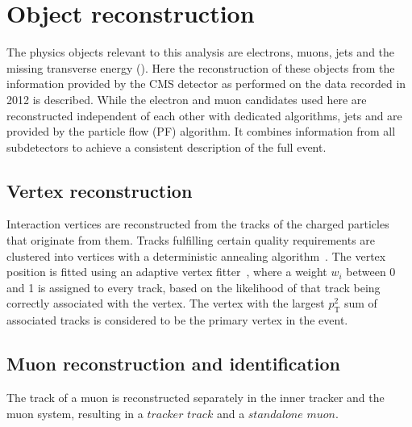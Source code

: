 \section{Object reconstruction}
The physics objects relevant to this analysis are electrons, muons, jets and the missing transverse energy (\MET). Here the reconstruction of these objects from the information provided by the CMS detector as performed on the data recorded in 2012 is described. While the electron and muon candidates used here are reconstructed independent of each other with dedicated algorithms, jets and \MET are provided by the particle flow (PF) algorithm. It combines information from all subdetectors to achieve a consistent description of the full event. 

\subsection{Vertex reconstruction}
Interaction vertices are reconstructed from the tracks of the charged particles that originate from them.
Tracks fulfilling certain quality requirements are clustered into vertices with a deterministic annealing algorithm~\cite{DertermisiticAnnealing,Chatrchyan:2014fea}. The vertex position is fitted using an adaptive vertex fitter~\cite{Fruehwirth:1027031}, where a weight $w_i$ between 0 and 1 is assigned to every track, based on the likelihood of that track being correctly associated with the vertex. The vertex with the largest $p_\mathrm{T}^2$ sum of associated tracks is considered to be the primary vertex in the event.

\subsection{Muon reconstruction and identification}
The track of a muon is reconstructed separately in the inner tracker and the muon system, resulting in a $\textit{tracker track}$ and a $\textit{standalone muon}$. 

